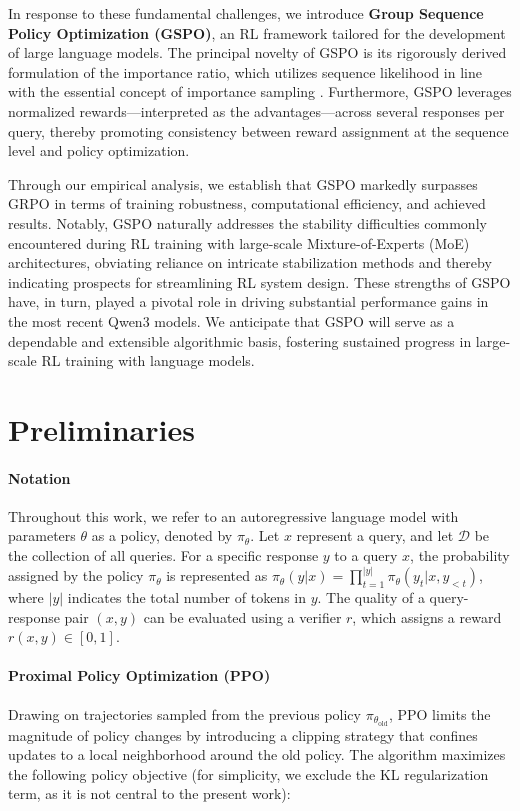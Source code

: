 In response to these fundamental challenges, we introduce \textbf{Group Sequence Policy Optimization (GSPO)}, an RL framework tailored for the development of large language models. The principal novelty of GSPO is its rigorously derived formulation of the importance ratio, which utilizes sequence likelihood in line with the essential concept of importance sampling \citep{click}. Furthermore, GSPO leverages normalized rewards—interpreted as the advantages—across several responses per query, thereby promoting consistency between reward assignment at the sequence level and policy optimization.

Through our empirical analysis, we establish that GSPO markedly surpasses GRPO in terms of training robustness, computational efficiency, and achieved results. Notably, GSPO naturally addresses the stability difficulties commonly encountered during RL training with large-scale Mixture-of-Experts (MoE) architectures, obviating reliance on intricate stabilization methods and thereby indicating prospects for streamlining RL system design. These strengths of GSPO have, in turn, played a pivotal role in driving substantial performance gains in the most recent Qwen3 models. We anticipate that GSPO will serve as a dependable and extensible algorithmic basis, fostering sustained progress in large-scale RL training with language models.

\section{Preliminaries}

\paragraph{Notation}
Throughout this work, we refer to an autoregressive language model with parameters $\theta$ as a policy, denoted by $\pi_\theta$.
Let $x$ represent a query, and let $\mathcal{D}$ be the collection of all queries. For a specific response $y$ to a query $x$, the probability assigned by the policy $\pi_\theta$ is represented as $\pi_\theta (y | x)=\prod_{t=1}^{|y|} \pi_\theta (y_t | x, y_{<t} )$, where $|y|$ indicates the total number of tokens in $y$. The quality of a query-response pair $(x, y)$ can be evaluated using a verifier $r$, which assigns a reward $r(x, y) \in [0, 1]$.

\paragraph{Proximal Policy Optimization (PPO)} Drawing on trajectories sampled from the previous policy $\pi_{\theta_\text{old}}$, PPO \citep{ppo} limits the magnitude of policy changes by introducing a clipping strategy that confines updates to a local neighborhood around the old policy. The algorithm maximizes the following policy objective (for simplicity, we exclude the KL regularization term, as it is not central to the present work):

